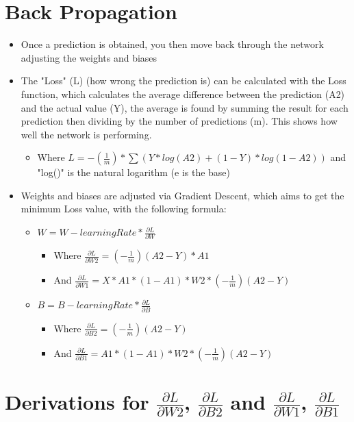 \documentclass[10pt,a4paper]{article}
\begin{document}
\section{Back Propagation}

\begin{itemize}
    \item Once a prediction is obtained, you then move back through the network adjusting the weights and biases
    \item The "Loss" (L) (how wrong the prediction is) can be calculated with the Loss function, which calculates the average difference between the prediction (A2) and the actual value (Y), the average is found by summing the result for each prediction then dividing by the number of predictions (m). This shows how well the network is performing.
    \begin{itemize}
        \item Where $L = -(\frac{1}{m}) * \sum(Y * log(A2) + (1-Y) * log(1-A2))$ and "log()" is the natural logarithm (e is the base)
    \end{itemize}
    \item Weights and biases are adjusted via Gradient Descent, which aims to get the minimum Loss value, with the following formula:
    \begin{itemize}
        \item $W = W - learningRate * \frac{\partial{L}}{\partial{W}}$
        \begin{itemize}
            \item Where $\frac{\partial{L}}{\partial{W2}} = (-\frac{1}{m})(A2-Y) * A1$
            \item And $\frac{\partial{L}}{\partial{W1}} = X * A1 * (1-A1) * W2 * (-\frac{1}{m})(A2-Y)$
        \end{itemize}
        \item $B = B - learningRate * \frac{\partial{L}}{\partial{B}}$
        \begin{itemize}
            \item Where $\frac{\partial{L}}{\partial{B2}} = (-\frac{1}{m})(A2-Y)$
            \item And $\frac{\partial{L}}{\partial{B1}} = A1 * (1-A1) * W2 * (-\frac{1}{m})(A2-Y)$
        \end{itemize}
    \end{itemize}
\end{itemize}

\section{Derivations for $\frac{\partial{L}}{\partial{W2}}$, $\frac{\partial{L}}{\partial{B2}}$ and $\frac{\partial{L}}{\partial{W1}}$, $\frac{\partial{L}}{\partial{B1}}$}
\end{document}
